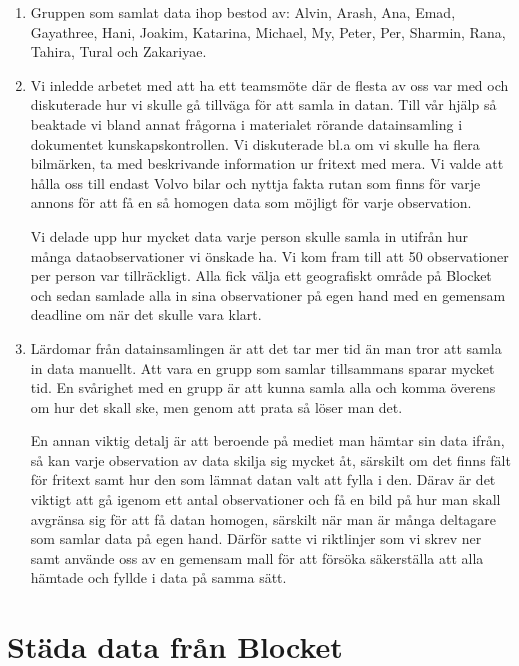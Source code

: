 \documentclass[
  letterpaper,
  DIV=11,
  numbers=noendperiod]{scrreprt}
\begin{document}
\begin{enumerate}
\def\labelenumi{\arabic{enumi}.}
\item
  Gruppen som samlat data ihop bestod av: Alvin, Arash, Ana, Emad,
  Gayathree, Hani, Joakim, Katarina, Michael, My, Peter, Per, Sharmin,
  Rana, Tahira, Tural och Zakariyae.
\item
  Vi inledde arbetet med att ha ett teamsmöte där de flesta av oss var
  med och diskuterade hur vi skulle gå tillväga för att samla in datan.
  Till vår hjälp så beaktade vi bland annat frågorna i materialet
  rörande datainsamling i dokumentet kunskapskontrollen. Vi diskuterade
  bl.a om vi skulle ha flera bilmärken, ta med beskrivande information
  ur fritext med mera. Vi valde att hålla oss till endast Volvo bilar
  och nyttja fakta rutan som finns för varje annons för att få en så
  homogen data som möjligt för varje observation.

  \vspace{1em}

  Vi delade upp hur mycket data varje person skulle samla in utifrån hur
  många dataobservationer vi önskade ha. Vi kom fram till att 50
  observationer per person var tillräckligt. Alla fick välja ett
  geografiskt område på Blocket och sedan samlade alla in sina
  observationer på egen hand med en gemensam deadline om när det skulle
  vara klart.
\item
  Lärdomar från datainsamlingen är att det tar mer tid än man tror att
  samla in data manuellt. Att vara en grupp som samlar tillsammans
  sparar mycket tid. En svårighet med en grupp är att kunna samla alla
  och komma överens om hur det skall ske, men genom att prata så löser
  man det.

  \vspace{1em}

  En annan viktig detalj är att beroende på mediet man hämtar sin data
  ifrån, så kan varje observation av data skilja sig mycket åt, särskilt
  om det finns fält för fritext samt hur den som lämnat datan valt att
  fylla i den. Därav är det viktigt att gå igenom ett antal
  observationer och få en bild på hur man skall avgränsa sig för att få
  datan homogen, särskilt när man är många deltagare som samlar data på
  egen hand. Därför satte vi riktlinjer som vi skrev ner samt använde
  oss av en gemensam mall för att försöka säkerställa att alla hämtade
  och fyllde i data på samma sätt.
\end{enumerate}

\section{Städa data från Blocket}\label{stuxe4da-data-fruxe5n-blocket}
\end{document}

